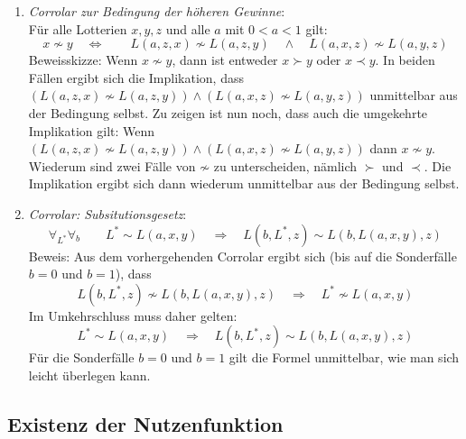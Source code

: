 \begin{enumerate}
  \item {\em Corrolar zur Bedingung der höheren Gewinne}:\\
  Für alle Lotterien $x,y,z$ und alle $a$ mit $0<a<1$ gilt:
  \[x \not\sim y \quad \Leftrightarrow \qquad L(a,z,x) \not\sim L(a,z,y)
  \quad \wedge \quad L(a,x,z) \not\sim L(a,y,z)
  \]
  Beweisskizze: Wenn $x \not\sim y$, dann ist entweder $x \succ y$ oder $x \prec
  y$. In beiden Fällen ergibt sich die Implikation, dass 
  $(L(a,z,x) \not\sim L(a,z,y)) \wedge (L(a,x,z) \not\sim L(a,y,z))$ unmittelbar
  aus der Bedingung selbst. Zu zeigen ist nun noch, dass auch die
  umgekehrte Implikation gilt: Wenn $(L(a,z,x) \not\sim
  L(a,z,y)) \wedge (L(a,x,z) \not\sim L(a,y,z))$ dann $x \not\sim y$. Wiederum
  sind zwei Fälle von $\not\sim$ zu unterscheiden, nämlich $\succ$ und $\prec$. 
  Die Implikation ergibt sich dann wiederum
  unmittelbar aus der Bedingung selbst.

  \item {\em Corrolar: Subsitutionsgesetz}:
  \label{Substitutionsgesetz} \[\forall_{L^*}\forall_{b} \qquad L^* \sim L(a,x,y)
  \quad \Rightarrow \quad L(b,L^*,z) \sim L(b, L(a,x,y), z) \] 
  Beweis: Aus dem vorhergehenden Corrolar ergibt sich (bis auf die Sonderfälle
  $b=0$ und $b=1$), dass 
  \[L(b, L^*, z) \not\sim L(b,L(a,x,y), z) \quad \Rightarrow \quad L^*
  \not\sim L(a,x,y)\] Im Umkehrschluss muss daher gelten:
  \[ L^* \sim L(a,x,y) \quad \Rightarrow \quad L(b,L^*,z) \sim L(b, L(a,x,y), z)
  \] Für die Sonderfälle $b=0$ und $b=1$ gilt die Formel unmittelbar, wie man sich
  leicht überlegen kann. 
\end{enumerate}

\subsection{Existenz der Nutzenfunktion}

